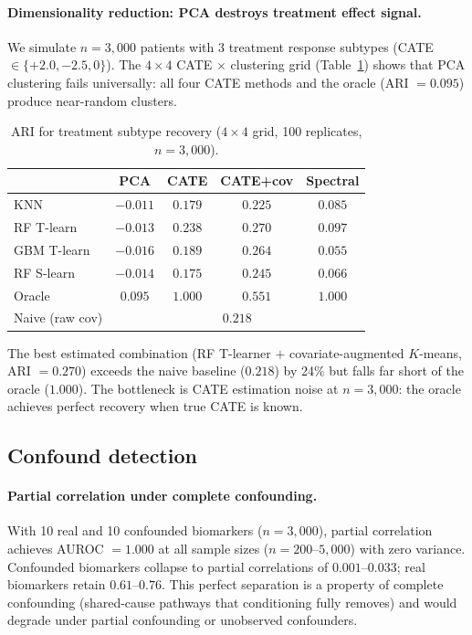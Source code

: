 \documentclass[11pt]{article}
\begin{document}
\paragraph{Dimensionality reduction: PCA destroys treatment effect signal.}
We simulate $n = 3{,}000$ patients with 3 treatment response subtypes (CATE $\in \{+2.0, -2.5, 0\}$).
The $4 \times 4$ CATE $\times$ clustering grid (Table~\ref{tab:hte}) shows that PCA clustering fails universally: all four CATE methods and the oracle (ARI $= 0.095$) produce near-random clusters.

\begin{table}[t]
\centering
\caption{ARI for treatment subtype recovery ($4 \times 4$ grid, 100 replicates, $n = 3{,}000$).}
\label{tab:hte}
\small
\begin{tabular}{@{}lcccc@{}}
\toprule
 & \textbf{PCA} & \textbf{CATE} & \textbf{CATE+cov} & \textbf{Spectral} \\
\midrule
KNN       & $-0.011$ & $0.179$ & $0.225$ & $0.085$ \\
RF T-learn  & $-0.013$ & $0.238$ & $\mathbf{0.270}$ & $0.097$ \\
GBM T-learn & $-0.016$ & $0.189$ & $0.264$ & $0.055$ \\
RF S-learn  & $-0.014$ & $0.175$ & $0.245$ & $0.066$ \\
\midrule
Oracle        & $0.095$  & $1.000$ & $0.551$ & $1.000$ \\
Naive (raw cov) & \multicolumn{4}{c}{$0.218$} \\
\bottomrule
\end{tabular}
\end{table}

The best estimated combination (RF T-learner $+$ covariate-augmented $K$-means, ARI $= 0.270$) exceeds the naive baseline ($0.218$) by 24\% but falls far short of the oracle ($1.000$).
The bottleneck is CATE estimation noise at $n = 3{,}000$: the oracle achieves perfect recovery when true CATE is known.

\subsection{Confound detection}
\label{sec:res-confound}

\paragraph{Partial correlation under complete confounding.}
With 10 real and 10 confounded biomarkers ($n = 3{,}000$), partial correlation achieves AUROC $= 1.000$ at all sample sizes ($n = 200$--$5{,}000$) with zero variance.
Confounded biomarkers collapse to partial correlations of $0.001$--$0.033$; real biomarkers retain $0.61$--$0.76$.
This perfect separation is a property of complete confounding (shared-cause pathways that conditioning fully removes) and would degrade under partial confounding or unobserved confounders.
\end{document}
